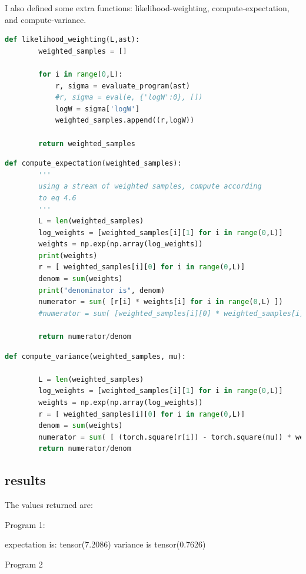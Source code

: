 \documentclass[12pt]{article}%
\theoremstyle{definition}
\begin{document}
	I also defined some extra functions: likelihood-weighting, compute-expectation, and compute-variance.
	
	\begin{lstlisting}[language=Python]
	def likelihood_weighting(L,ast):
	    weighted_samples = []
	
	    for i in range(0,L):
	        r, sigma = evaluate_program(ast)
	        #r, sigma = eval(e, {'logW':0}, [])
	        logW = sigma['logW']
	        weighted_samples.append((r,logW))
	        
	    return weighted_samples
	\end{lstlisting}
	
	\begin{lstlisting}[language=Python]
	def compute_expectation(weighted_samples):
	    '''
	    using a stream of weighted samples, compute according
	    to eq 4.6 
	    '''
	    L = len(weighted_samples)
	    log_weights = [weighted_samples[i][1] for i in range(0,L)]
	    weights = np.exp(np.array(log_weights))
	    print(weights)
	    r = [ weighted_samples[i][0] for i in range(0,L)]
	    denom = sum(weights)
	    print("denominator is", denom)
	    numerator = sum( [r[i] * weights[i] for i in range(0,L) ])
	    #numerator = sum( [weighted_samples[i][0] * weighted_samples[i][1] for i in range(0,L) ])
	
	    return numerator/denom
	\end{lstlisting}
		
	\begin{lstlisting}[language=Python]
	def compute_variance(weighted_samples, mu):
	
	    L = len(weighted_samples)
	    log_weights = [weighted_samples[i][1] for i in range(0,L)]
	    weights = np.exp(np.array(log_weights))
	    r = [ weighted_samples[i][0] for i in range(0,L)]
	    denom = sum(weights)
	    numerator = sum( [ (torch.square(r[i]) - torch.square(mu)) * weights[i] for i in range(0,L) ])
	    return numerator/denom
	\end{lstlisting}
	
	\subsection{results}
	
	The values returned are:
	
	Program 1:
	
	expectation is: tensor(7.2086)
	variance is tensor(0.7626) 
	 
	
	Program 2
	 
\end{document}
